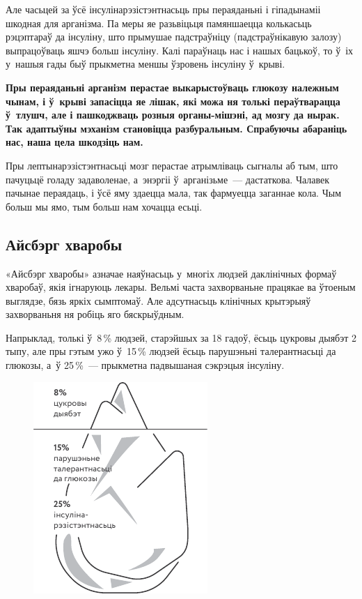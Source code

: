 Але часьцей за ўсё інсулінарэзістэнтнасьць пры пераяданьні і гіпадынаміі шкодная для арганізма. Па меры яе разьвіцьця памяншаецца колькасьць рэцэптараў да інсуліну, што прымушае падстраўніцу (падстраўнікавую залозу) выпрацоўваць яшчэ больш інсуліну. Калі параўнаць нас і нашых бацькоў, то ў~іх у~нашыя гады быў прыкметна меншы ўзровень інсуліну ў~крыві.

\textbf{Пры пераяданьні арганізм перастае выкарыстоўваць глюкозу належным чынам, і ў~крыві запасіцца яе лішак, які можа ня толькі пераўтварацца ў~тлушч, але і пашкоджваць розныя органы-мішэні, ад мозгу да нырак. Так адаптыўны мэханізм становіцца разбуральным. Спрабуючы абараніць нас, наша цела шкодзіць нам.}

Пры лептынарэзістэнтнасьці мозг перастае атрымліваць сыгналы аб тым, што пачуцьцё голаду задаволенае, а~энэргіі ў~арганізьме~--- дастаткова. Чалавек пачынае пераядаць, і ўсё яму здаецца мала, так фармуецца заганнае кола. Чым больш мы ямо, тым больш нам хочацца есьці.

\subsection*{Айсбэрг хваробы}

«Айсбэрг хваробы» азначае наяўнасьць у~многіх людзей даклінічных формаў хваробаў, якія ігнаруюць лекары. Вельмі часта захворваньне працякае ва ўтоеным выглядзе, бязь яркіх сымптомаў. Але адсутнасьць клінічных крытэрыяў захворваньня ня робіць яго бяскрыўдным. 

Напрыклад, толькі ў~8\,\% людзей, старэйшых за 18 гадоў, ёсьць цукровы дыябэт 2 тыпу, але пры гэтым ужо ў~15\,\% людзей ёсьць парушэньні талерантнасьці да глюкозы, а~ў 25\,\%~--- прыкметна падвышаная сэкрэцыя інсуліну.

\begin{figure}[htb!]
  \centering
  \includegraphics[scale=1.5]{willpower/ch2/7.pdf}
\end{figure}

